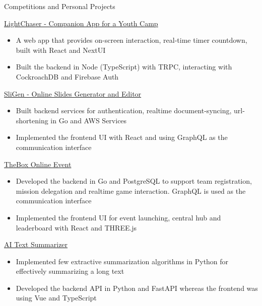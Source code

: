 \documentclass{article}
\newlength{\tabin}
\newlength{\secsep}
\newcommand{\lineunder}{\vspace*{-8pt} \\ \hspace*{-6pt} \hrulefill \\ \vspace*{-15pt}}
\newenvironment{tabbedsection}[1]{
  \begin{list}{}{
      \setlength{\itemsep}{0pt}
      \setlength{\labelsep}{0pt}
      \setlength{\labelwidth}{0pt}
      \setlength{\leftmargin}{\tabin}
      \setlength{\rightmargin}{\tabin}
      \setlength{\listparindent}{0pt}
      \setlength{\parsep}{0pt}
      \setlength{\parskip}{0pt}
      \setlength{\partopsep}{0pt}
      \setlength{\topsep}{#1}
    }
  \item[]
}{\end{list}}
\newenvironment{resume_section}[1]{
  \filbreak
  \vspace{2\secsep}
  \textsc{\large#1}
  \lineunder
  \begin{tabbedsection}{\secsep}
}{\end{tabbedsection}}
\newenvironment{resume_subsection}[2][]{
  \textbf{#2} \hfill {\footnotesize #1} \hspace{2em}
  \begin{tabbedsection}{0.5\secsep}
}{\end{tabbedsection}}
\newenvironment{subitems}{
  \renewcommand{\labelitemi}{-}
  \begin{itemize}
      \setlength{\labelsep}{1em}
}{\end{itemize}}
\begin{document}
\begin{resume_section}{Competitions and Personal Projects}
  \begin{resume_subsection}[(April 2022)]{\href{https://github.com/marcustut/lightchaser}{LightChaser - Companion App for a Youth Camp}}
    \begin{subitems}
      \item A web app that provides on-screen interaction, real-time timer countdown, built with React and NextUI
      \item Built the backend in Node (TypeScript) with TRPC, interacting with CockroachDB and Firebase Auth
    \end{subitems}
  \end{resume_subsection}

  \begin{resume_subsection}{\href{https://github.com/marcustut/fyp}{SliGen - Online Slides Generator and Editor}}
    \begin{subitems}
      \item Built backend services for authentication, realtime document-syncing, url-shortening in Go and AWS Services
      \item Implemented the frontend UI with React and using GraphQL as the communication interface
    \end{subitems}
  \end{resume_subsection}


  \begin{resume_subsection}{\href{https://github.com/marcustut/thebox}{TheBox Online Event}}
    \begin{subitems}
      \item Developed the backend in Go and PostgreSQL to support team registration, mission delegation and realtime game interaction. GraphQL is used as the communication interface
      \item Implemented the frontend UI for event launching, central hub and leaderboard with React and THREE.js
    \end{subitems}
  \end{resume_subsection}

  \begin{resume_subsection}{\href{https://github.com/marcustut/summarize}{AI Text Summarizer}}
    \begin{subitems}
      \item Implemented few extractive summarization algorithms in Python for effectively summarizing a long text
      \item Developed the backend API in Python and FastAPI whereas the frontend was using Vue and TypeScript
    \end{subitems}
  \end{resume_subsection}


\end{resume_section}
\end{document}
